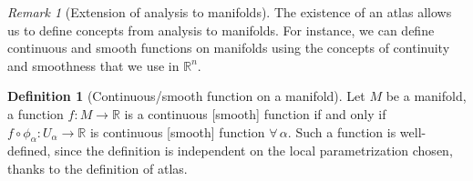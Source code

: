 \documentclass[a4paper,11pt,titlepage, article, oneside]{memoir}
\numberwithin{equation}{section}
\theoremstyle{definition}
\newtheorem{definition}[theorem]{Definition}
\theoremstyle{remark}
\newtheorem{remark}[theorem]{Remark}
\newcommand{\rfield}{\mathbb{R}}
\begin{document}
\begin{remarkbox}\begin{remark}[Extension of analysis to manifolds]
  The existence of an atlas allows us to define concepts from analysis to manifolds. For instance, we can define continuous and smooth functions on manifolds using the concepts of continuity and smoothness that we use in $\rfield^n$.
\end{remark}\end{remarkbox}

\begin{definition}[Continuous/smooth function on a manifold]
  Let $M$ be a manifold, a function $f \colon M \rightarrow \rfield$ is a continuous [smooth] function if and only if $f \circ \phi_{\alpha} \colon U_{\alpha} \rightarrow \rfield$ is continuous [smooth] function $\forall \, \alpha$. Such a function is well-defined, since the definition is independent on the local parametrization chosen, thanks to the definition of atlas.
\end{definition}
\end{document}
